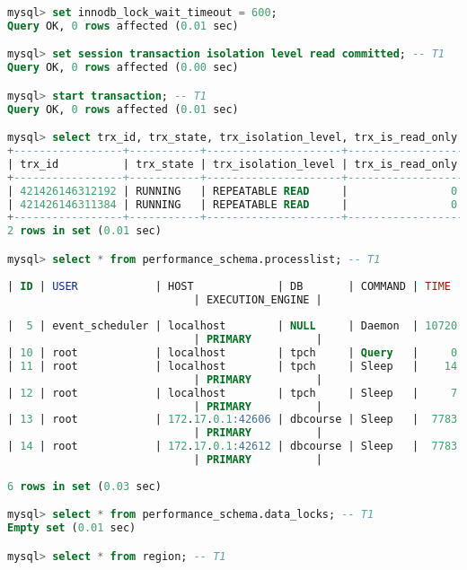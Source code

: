 \documentclass{article}
\begin{document}
\begin{lstlisting}[language=sql]
mysql> set innodb_lock_wait_timeout = 600;
Query OK, 0 rows affected (0.01 sec)

mysql> set session transaction isolation level read committed; -- T1
Query OK, 0 rows affected (0.00 sec)

mysql> start transaction; -- T1
Query OK, 0 rows affected (0.01 sec)

mysql> select trx_id, trx_state, trx_isolation_level, trx_is_read_only from information_schema.innodb_trx; -- T1
+-----------------+-----------+---------------------+------------------+
| trx_id          | trx_state | trx_isolation_level | trx_is_read_only |
+-----------------+-----------+---------------------+------------------+
| 421426146312192 | RUNNING   | REPEATABLE READ     |                0 |
| 421426146311384 | RUNNING   | REPEATABLE READ     |                0 |
+-----------------+-----------+---------------------+------------------+
2 rows in set (0.01 sec)

mysql> select * from performance_schema.processlist; -- T1
    
| ID | USER            | HOST             | DB       | COMMAND | TIME  | STATE                  | INFO
                             | EXECUTION_ENGINE |
    
|  5 | event_scheduler | localhost        | NULL     | Daemon  | 10720 | Waiting on empty queue | NULL
                             | PRIMARY          |
| 10 | root            | localhost        | tpch     | Query   |     0 | executing              | select * from performance_schema.processlist -- T1 | PRIMARY          |
| 11 | root            | localhost        | tpch     | Sleep   |    14 |                        | NULL
                             | PRIMARY          |
| 12 | root            | localhost        | tpch     | Sleep   |     7 |                        | NULL
                             | PRIMARY          |
| 13 | root            | 172.17.0.1:42606 | dbcourse | Sleep   |  7783 |                        | NULL
                             | PRIMARY          |
| 14 | root            | 172.17.0.1:42612 | dbcourse | Sleep   |  7783 |                        | NULL
                             | PRIMARY          |
    
6 rows in set (0.03 sec)

mysql> select * from performance_schema.data_locks; -- T1
Empty set (0.01 sec)

mysql> select * from region; -- T1
    

\end{lstlisting}
\end{document}
